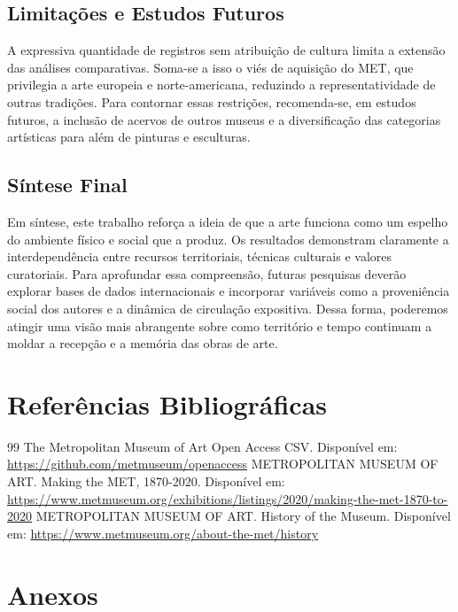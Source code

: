 \documentclass[11pt,a4paper]{article}
\begin{document}
\subsection*{Limitações e Estudos Futuros}
A expressiva quantidade de registros sem atribuição de cultura limita a extensão das análises comparativas. Soma-se a isso o viés de aquisição do MET, que privilegia a arte europeia e norte-americana, reduzindo a representatividade de outras tradições. Para contornar essas restrições, recomenda-se, em estudos futuros, a inclusão de acervos de outros museus e a diversificação das categorias artísticas para além de pinturas e esculturas.

\subsection*{Síntese Final}
Em síntese, este trabalho reforça a ideia de que a arte funciona como um espelho do ambiente físico e social que a produz. Os resultados demonstram claramente a interdependência entre recursos territoriais, técnicas culturais e valores curatoriais. Para aprofundar essa compreensão, futuras pesquisas deverão explorar bases de dados internacionais e incorporar variáveis como a proveniência social dos autores e a dinâmica de circulação expositiva. Dessa forma, poderemos atingir uma visão mais abrangente sobre como território e tempo continuam a moldar a recepção e a memória das obras de arte.


\newpage
\section*{Referências Bibliográficas}
\begin{thebibliography}{99}
   The Metropolitan Museum of Art Open Access CSV. Disponível em: \url{https://github.com/metmuseum/openaccess}
   METROPOLITAN MUSEUM OF ART. Making the MET, 1870-2020. Disponível em: \url{https://www.metmuseum.org/exhibitions/listings/2020/making-the-met-1870-to-2020}
   METROPOLITAN MUSEUM OF ART. History of the Museum. Disponível em: \url{https://www.metmuseum.org/about-the-met/history}
\end{thebibliography}

\appendix
\section{Anexos}
\end{document}
